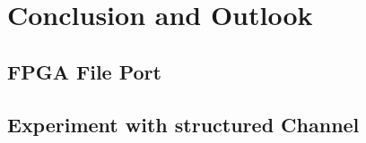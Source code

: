 \chapter{Conclusion and Outlook}
\label{ch:conOutlook}

\section{FPGA File Port}\label{sec:FPGAChange}
\section{Experiment with structured Channel}\label{sec:StrucChannel}

